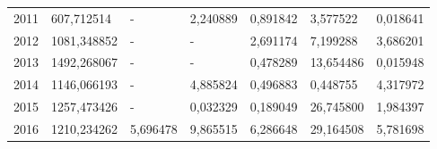 \begin{table}
\begin{tabular}{p{1cm}p{2cm}p{2cm}p{2cm}p{2cm}p{2cm}p{2cm}}
 2011 &                607,712514 &                - &             2,240889 &                                0,891842 &  3,577522 &                   0,018641 \\
 2012 &               1081,348852 &                - &                    - &                                2,691174 &  7,199288 &                   3,686201 \\
 2013 &               1492,268067 &                - &                    - &                                0,478289 & 13,654486 &                   0,015948 \\
 2014 &               1146,066193 &                - &             4,885824 &                                0,496883 &  0,448755 &                   4,317972 \\
 2015 &               1257,473426 &                - &             0,032329 &                                0,189049 & 26,745800 &                   1,984397 \\
 2016 &               1210,234262 &         5,696478 &             9,865515 &                                6,286648 & 29,164508 &                   5,781698 \\
\bottomrule
\end{tabular}
\end{table}
